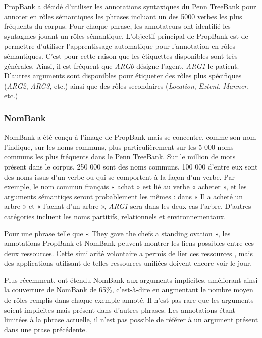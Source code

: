 PropBank \citep{palmer2005proposition} a décidé d'utiliser les annotations
syntaxiques du Penn TreeBank \citep{marcus1993building} pour annoter en rôles
sémantiques les phrases incluant un des 5000 verbes les plus fréquents du
corpus. Pour chaque phrase, les annotateurs ont identifié les syntagmes jouant
un rôles sémantique. L'objectif principal de PropBank est de permettre
d'utiliser l'apprentissage automatique pour l'annotation en rôles sémantiques.
C'est pour cette raison que les étiquettes disponibles sont très générales.
Ainsi, il est fréquent que \textit{ARG0} désigne l'agent, \textit{ARG1} le
patient. D'autres arguments sont disponibles pour étiqueter des rôles plus
spécifiques (\textit{ARG2}, \textit{ARG3}, etc.) ainsi que des rôles
secondaires (\textit{Location}, \textit{Extent}, \textit{Manner}, etc.)

\subsubsection{NomBank}

NomBank \citep{meyers2004nombank} a été conçu à l'image de PropBank mais se
concentre, comme son nom l'indique, sur les noms communs, plus particulièrement
sur les 5 000 noms communs les plus fréquents dans le Penn TreeBank. Sur le
million de mots présent dans le corpus, 250 000 sont des noms communs. 100 000
d'entre eux sont des noms issus d'un verbe ou qui se comportent à la façon d'un
verbe. Par exemple, le nom commun français « achat » est lié au verbe « acheter
», et les arguments sémantiqes seront probablement les mêmes : dans « Il a
acheté un arbre » et « l'achat d'un arbre », \textit{ARG1} sera dans les deux
cas l'arbre. D'autres catégories incluent les noms partitifs, relationnels et
environnementaux.

Pour une phrase telle que « They gave the chefs a standing ovation », les
annotations PropBank et NomBank peuvent montrer les liens possibles entre ces
deux ressources. Cette similarité volontaire a permis de lier ces ressources
\citep{pustejovsky2005merging,verhagen2007combining}, mais des applications
utilisant de telles ressources unifiées doivent encore voir le jour.

Plus récemment, \cite{gerber2010beyond} ont étendu NomBank aux arguments
implicites, améliorant ainsi la couverture de NomBank de 65\%, c'est-à-dire en
augmentant le nombre moyen de rôles remplis dans chaque exemple annoté. Il
n'est pas rare que les arguments soient implicites mais présent dans d'autres
phrases. Les annotations étant limitées à la phrase actuelle, il n'est pas
possible de référer à un argument présent dans une prase précédente.


